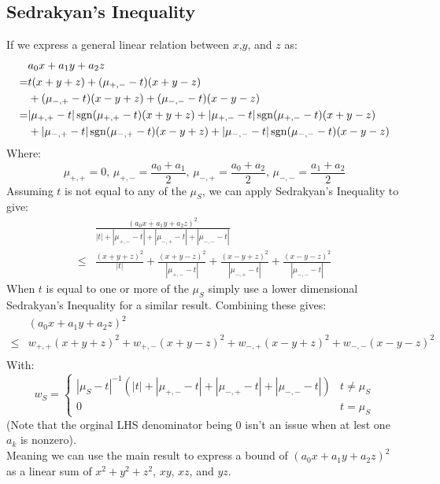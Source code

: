 \subsection{Sedrakyan's Inequality}
If we express a general linear relation between $x$,$y$, and $z$ as:
\[\begin{aligned}
	&a_0x+a_1y+a_2z\\
	=& t(x+y+z) + (\mu_{+,-}-t)(x+y-z)\\
	&+(\mu_{-,+}-t)(x-y+z)+(\mu_{-,-}-t)(x-y-z)\\
	=& |\mu_{+,+}-t|\operatorname{sgn}(\mu_{+,+}-t)(x+y+z) + |\mu_{+,-}-t|\operatorname{sgn}(\mu_{+,-}-t)(x+y-z)\\
	&+|\mu_{-,+}-t|\operatorname{sgn}(\mu_{-,+}-t)(x-y+z)+|\mu_{-,-}-t|\operatorname{sgn}(\mu_{-,-}-t)(x-y-z)\\
\end{aligned}\]
Where:
\[\mu_{+,+} =0,\,\mu_{+,-} = \frac{a_0+a_1}{2},\,\mu_{-,+}=\frac{a_0+a_2}{2},\,\mu_{-,-}=\frac{a_1+a_2}{2}\]
Assuming $t$ is not equal to any of the $\mu_S$, we can apply Sedrakyan's Inequality to give: 
\[\begin{aligned}
	&\frac{(a_0x+a_1y+a_2z)^2}{|t|+|\mu_{+,-}-t|+|\mu_{-,+}-t|+|\mu_{-,-}-t|}\\
	\leq&\frac{(x+y+z)^2}{|t|}+\frac{(x+y-z)^2}{|\mu_{+,-}-t|}+\frac{(x-y+z)^2}{|\mu_{-,+}-t|}+\frac{(x-y-z)^2}{|\mu_{-,-}-t|}
\end{aligned}\]
When $t$ is equal to one or more of the $\mu_S$ simply use a lower dimensional Sedrakyan's Inequality for a similar result.
Combining these gives:
\[\begin{aligned}
	&(a_0x+a_1y+a_2z)^2\\
	\leq&w_{+,+}(x+y+z)^2+w_{+,-}(x+y-z)^2+w_{-,+}(x-y+z)^2+w_{-,-}(x-y-z)^2\\
\end{aligned}\]
With:
\[w_S = \begin{cases}|\mu_S-t|^{-1}(|t|+|\mu_{+,-}-t|+|\mu_{-,+}-t|+|\mu_{-,-}-t|)&t\neq \mu_S\\0&t=\mu_S\end{cases}\]
(Note that the orginal LHS denominator being $0$ isn't an issue when at lest one $a_k$ is nonzero).
\\

Meaning we can use the main result to express a bound of $(a_0x+a_1y+a_2z)^2$ as a linear sum of $x^2+y^2+z^2$, $xy$, $xz$, and $yz$.
